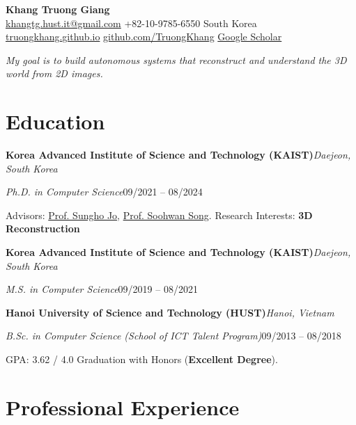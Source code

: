\documentclass[11pt,a4paper]{article}
\newcommand{\entry}[2]{\noindent\textbf{#1}\hfill\textit{#2}\par}
\newcommand{\subentry}[2]{\noindent\textit{#1}\hfill #2\par\vspace{2pt}}
\begin{document}
\begin{center}
    {\Huge\bfseries\color{accent} Khang Truong Giang}\\[7pt]
    \small
    \href{mailto:khangtg.hust.it@gmail.com}{khangtg.hust.it@gmail.com}
    \quad\textbar\quad
    +82-10-9785-6550
    \quad\textbar\quad
    South Korea\\[3pt]
    \href{https://truongkhang.github.io}{truongkhang.github.io}
    \quad\textbar\quad
    \href{https://github.com/TruongKhang}{github.com/TruongKhang}
    \quad\textbar\quad
    \href{https://scholar.google.com/citations?user=mEvl5GsAAAAJ}{Google Scholar}
\end{center}

\vspace{2pt}
\noindent\textit{My goal is to build autonomous systems that reconstruct and understand the 3D world from 2D images.}

\section{Education}

\entry{Korea Advanced Institute of Science and Technology (KAIST)}{Daejeon, South Korea}
\subentry{Ph.D. in Computer Science}{09/2021 -- 08/2024}
Advisors: \href{https://pure.kaist.ac.kr/en/persons/sungho-jo/}{Prof. Sungho Jo}, \href{https://sites.google.com/view/smrlab/professor}{Prof. Soohwan Song}. \quad Research Interests: \textbf{3D Reconstruction}
\vspace{5pt}

\entry{Korea Advanced Institute of Science and Technology (KAIST)}{Daejeon, South Korea}
\subentry{M.S. in Computer Science}{09/2019 -- 08/2021}
\vspace{5pt}

\entry{Hanoi University of Science and Technology (HUST)}{Hanoi, Vietnam}
\subentry{B.Sc. in Computer Science (School of ICT Talent Program)}{09/2013 -- 08/2018}
GPA: 3.62 / 4.0 \quad\textbar\quad Graduation with Honors (\textbf{Excellent Degree}).

\section{Professional Experience}
\end{document}
